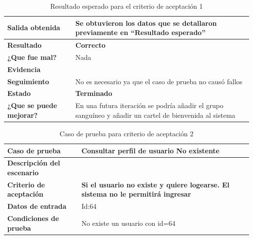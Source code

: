     {\scriptsize
	\begin{table}[h]
	\centering
	\begin{tabular}{|l|p{10cm}|}
	    \hline 
	    \textbf{Salida obtenida}&Se obtuvieron los datos que se detallaron previamente en ``Resultado esperado''\\ \hline
	    \textbf{Resultado}& \textbf{Correcto}\\ \hline
        \textbf{¿Que fue mal?}& Nada\\ \hline      
        \textbf{Evidencia}&  \\ \hline
        \textbf{Seguimiento}& No es necesario ya que el caso de prueba no causó fallos \\ \hline
        \textbf{Estado}& \textbf{Terminado}\\ \hline        
        \textbf{¿Que se puede mejorar?}& En una futura iteración se podría añadir el grupo sanguíneo y añadir un cartel de bienvenida al sistema \\ \hline              
	    \end{tabular}
        \caption{Resultado esperado para el criterio de aceptación 1}
    	\end{table}
	}
    

    
\clearpage    
    
    {\scriptsize
	\begin{table}[h]
	\centering
	\begin{tabular}{||l|p{10cm}||}
    	\rowcolor[gray]{0.9}
	    \hline 
        \hline 
	    \textbf{Caso de prueba} & \textbf{Consultar perfil de usuario No existente} \\  \hline
	    \textbf{Descripción del escenario}&\\ \hline
	    \textbf{Criterio de aceptación}&\textbf{Si el usuario no existe y quiere logearse. El sistema no le permitirá ingresar}\\ \hline
        \textbf{Datos de entrada}&  Id:64\\ \hline
        \textbf{Condiciones de  prueba}& No existe un usuario con id=64 \\ \hline \hline
	    \end{tabular}
        \caption{Caso de prueba para criterio de aceptación 2}
    	\end{table}
	}
    
